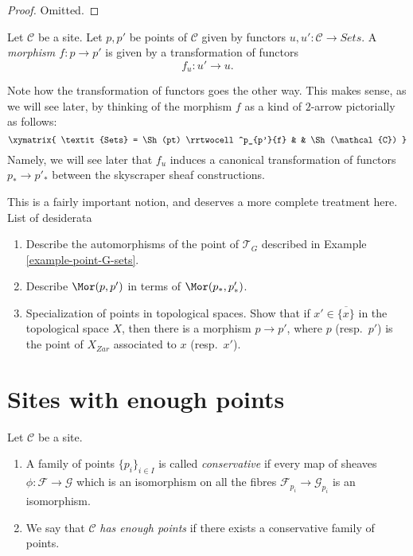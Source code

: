 \begin{proof}
Omitted.
\end{proof}

\begin{definition}
\label{definition-morphism-points}
Let $\mathcal{C}$ be a site. Let $p, p'$ be points of $\mathcal{C}$
given by functors $u, u' : \mathcal{C} \to \textit{Sets}$.
A {\it morphism $f : p \to p'$} is given by a transformation of
functors
$$
f_u : u' \to u.
$$
\end{definition}

\noindent
Note how the transformation of functors goes the other way.
This makes sense, as we will see later, by thinking of
the morphism $f$ as a kind of $2$-arrow pictorially as
follows:
$$
\xymatrix{
\textit{Sets}
=
\Sh(pt)
\rrtwocell^p_{p'}{f}
&
&
\Sh(\mathcal{C})
}
$$
Namely, we will see later that $f_u$ induces a canonical
transformation of functors $p_* \to p'_*$ between
the skyscraper sheaf constructions.

\medskip\noindent
This is a fairly important notion, and deserves a more complete
treatment here. List of desiderata
\begin{enumerate}
\item Describe the automorphisms of the point of $\mathcal{T}_G$
described in Example \ref{example-point-G-sets}.
\item Describe $\Mor(p, p')$ in terms of  $\Mor(p_*, p'_*)$.
\item Specialization of points in topological spaces.
Show that if $x' \in \overline{\{x\}}$ in the topological space
$X$, then there is a morphism $p \to p'$, where $p$ (resp.\ $p'$)
is the point of $X_{Zar}$ associated to $x$ (resp.\ $x'$).
\end{enumerate}




\section{Sites with enough points}
\label{section-sites-enough-points}

\begin{definition}
\label{definition-enough-points}
Let $\mathcal{C}$ be a site.
\begin{enumerate}
\item A family of points $\{p_i\}_{i\in I}$ is called {\it conservative}
if every map of sheaves $\phi : \mathcal{F} \to \mathcal{G}$
which is an isomorphism on all the fibres $\mathcal{F}_{p_i}
\to \mathcal{G}_{p_i}$ is an isomorphism.
\item  We say that $\mathcal{C}$ {\it has enough points}
if there exists a conservative family of points.
\end{enumerate}
\end{definition}

